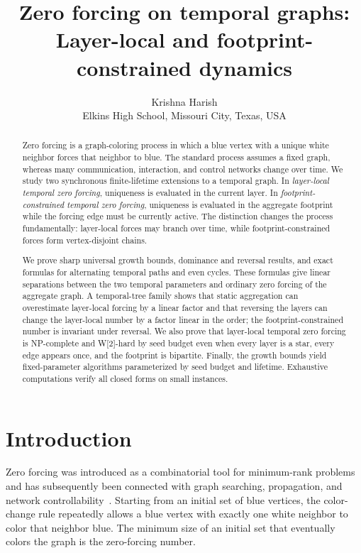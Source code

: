\documentclass[11pt]{article}
\title{Zero forcing on temporal graphs:\\
Layer-local and footprint-constrained dynamics}
\author{Krishna Harish\\
Elkins High School, Missouri City, Texas, USA}
\date{}
\theoremstyle{definition}
\theoremstyle{remark}
\begin{document}
\maketitle

\begin{abstract}
Zero forcing is a graph-coloring process in which a blue vertex with a unique
white neighbor forces that neighbor to blue.  The standard process assumes a
fixed graph, whereas many communication, interaction, and control networks
change over time.  We study two synchronous finite-lifetime extensions to a
temporal graph.  In \emph{layer-local temporal zero forcing}, uniqueness is
evaluated in the current layer.  In \emph{footprint-constrained temporal zero
forcing}, uniqueness is evaluated in the aggregate footprint while the
forcing edge must be currently active.  The distinction changes the process
fundamentally: layer-local forces may branch over time, while
footprint-constrained forces form vertex-disjoint chains.

We prove sharp universal growth bounds, dominance and reversal results, and
exact formulas for alternating temporal paths and even cycles.  These formulas
give linear separations between the two temporal parameters and ordinary zero
forcing of the aggregate graph.  A temporal-tree family shows that static
aggregation can overestimate layer-local forcing by a linear factor and that
reversing the layers can change the layer-local number by a factor linear in
the order; the footprint-constrained number is invariant under reversal.  We
also prove that layer-local temporal zero forcing is NP-complete and
W[2]-hard by seed budget even when every layer is a star, every edge appears
once, and the footprint is bipartite.  Finally, the growth bounds yield
fixed-parameter algorithms parameterized by seed budget and lifetime.
Exhaustive computations verify all closed forms on small instances.
\end{abstract}

\section{Introduction}

Zero forcing was introduced as a combinatorial tool for minimum-rank
problems and has subsequently been connected with graph searching,
propagation, and network controllability~\cite{aim2008,yang2013,fallat2016,
monshizadeh2014}.  Starting
from an initial set of blue vertices, the color-change rule repeatedly allows
a blue vertex with exactly one white neighbor to color that neighbor blue.
The minimum size of an initial set that eventually colors the graph is the
zero-forcing number.
\end{document}
